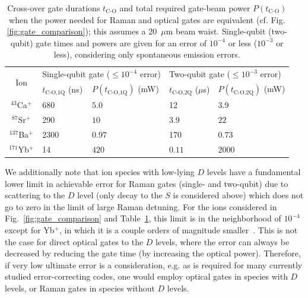 \documentclass[%
12pt,
 amsmath,amssymb,
]{revtex4-2}
\begin{document}
\begin{table}[t b h !]
\caption{Cross-over gate durations $t_{\textrm{C-O}}$ and total required gate-beam power $P(t_{\textrm{C-O}})$ when the power needed for Raman and optical gates are equivalent (cf. Fig.\ref{fig:gate_comparison}); this assumes a 20~$\mu$m beam waist.  Single-qubit (two-qubit) gate times and powers are given for an error of $10^{-4}$ or less ($10^{-3}$ or less), considering only spontaneous emission errors.}
\begin{ruledtabular}
\begin{tabular}{cllll}

\multirow{2}{*}{Ion } & \multicolumn{2}{l}{Single-qubit gate ($\leq 10^{-4}$ error)} & \multicolumn{2}{l}{Two-qubit gate ($\leq 10^{-3}$ error)} \\
                     &   $t_{\textrm{C-O,1Q}}$ (ns)  &  $P(t_{\textrm{C-O,1Q}})$ (mW) &   $t_{\textrm{C-O,2Q}}$ ($\mu$s)  &  $P(t_{\textrm{C-O,2Q}})$ (mW) \\
\hline
\rule{0pt}{4ex} $^{43}$Ca$^{+}$  &  680 & $5.0$    &  12        &  $3.9$  \\
$^{87}$Sr$^{+}$  &  290                 &  $10$    &  3.9       &  $22$  \\
$^{137}$Ba$^{+}$ &  2300                &  $0.97$  &  170       &  $0.73$  \\
$^{171}$Yb$^{+}$ &  14                  &  $420$   &  $0.11$    &  $2000$  \\

\end{tabular}
\end{ruledtabular}

\label{tab:raman_optical}
\end{table}

We additionally note that ion species with low-lying $D$ levels have a fundamental lower limit in achievable error for Raman gates (single- and two-qubit) due to scattering to the $D$ level (only decay to the $S$ is considered above) which does not go to zero in the limit of large Raman detuning.  For the ions considered in Fig.~\ref{fig:gate_comparison} and Table~\ref{tab:raman_optical}, this limit is in the neighborhood of $10^{-4}$ except for Yb$^{+}$, in which it is a couple orders of magnitude smaller~\cite{PhysRevA.75.042329_2007}. This is not the case for direct optical gates to the $D$ levels, where the error can always be decreased by reducing the gate time (by increasing the optical power).  Therefore, if very low ultimate error is a consideration, e.g. as is required for many currently studied error-correcting codes, one would employ optical gates in species with $D$ levels, or Raman gates in species without $D$ levels.
\end{document}
